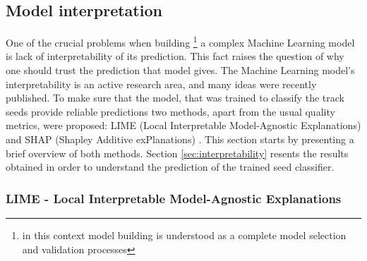 \subsection{Model interpretation}

One of the crucial problems when building \footnote{in this context model building is understood as a complete model selection and validation processes} a complex Machine Learning model is lack of interpretability of its prediction. This fact raises the question of why one should trust the prediction that model gives. The Machine Learning model's interpretability is an active research area, and many ideas were recently published. To make sure that the model, that was trained to classify the track seeds provide reliable predictions two methods, apart from the usual quality metrics,
were proposed: LIME (Local Interpretable Model-Agnostic Explanations) \cite{lime} and SHAP (Shapley Additive exPlanations) \cite{shap}. This section starts by presenting a brief overview of both methods. Section \ref{sec:interpretability} resents the results obtained in order to understand the prediction of the trained seed classifier.
\subsubsection{LIME - Local Interpretable Model-Agnostic Explanations }

